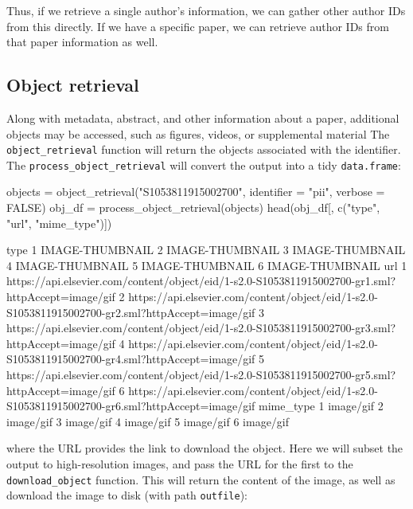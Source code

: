 Thus, if we retrieve a single author's information, we can gather other
author IDs from this directly. If we have a specific paper, we can
retrieve author IDs from that paper information as well.

\hypertarget{object-retrieval}{%
\subsection{Object retrieval}\label{object-retrieval}}

Along with metadata, abstract, and other information about a paper,
additional objects may be accessed, such as figures, videos, or
supplemental material The \texttt{object\_retrieval} function will
return the objects associated with the identifier. The
\texttt{process\_object\_retrieval} will convert the output into a tidy
\texttt{data.frame}:

\begin{Schunk}
\begin{Sinput}
objects = object_retrieval("S1053811915002700", identifier = "pii", verbose = FALSE)
obj_df = process_object_retrieval(objects)
head(obj_df[, c("type", "url", "mime_type")])
\end{Sinput}
\begin{Soutput}
             type
1 IMAGE-THUMBNAIL
2 IMAGE-THUMBNAIL
3 IMAGE-THUMBNAIL
4 IMAGE-THUMBNAIL
5 IMAGE-THUMBNAIL
6 IMAGE-THUMBNAIL
                                                                                                url
1 https://api.elsevier.com/content/object/eid/1-s2.0-S1053811915002700-gr1.sml?httpAccept=image/gif
2 https://api.elsevier.com/content/object/eid/1-s2.0-S1053811915002700-gr2.sml?httpAccept=image/gif
3 https://api.elsevier.com/content/object/eid/1-s2.0-S1053811915002700-gr3.sml?httpAccept=image/gif
4 https://api.elsevier.com/content/object/eid/1-s2.0-S1053811915002700-gr4.sml?httpAccept=image/gif
5 https://api.elsevier.com/content/object/eid/1-s2.0-S1053811915002700-gr5.sml?httpAccept=image/gif
6 https://api.elsevier.com/content/object/eid/1-s2.0-S1053811915002700-gr6.sml?httpAccept=image/gif
  mime_type
1 image/gif
2 image/gif
3 image/gif
4 image/gif
5 image/gif
6 image/gif
\end{Soutput}
\end{Schunk}

where the URL provides the link to download the object. Here we will
subset the output to high-resolution images, and pass the URL for the
first to the \texttt{download\_object} function. This will return the
content of the image, as well as download the image to disk (with path
\texttt{outfile}):

